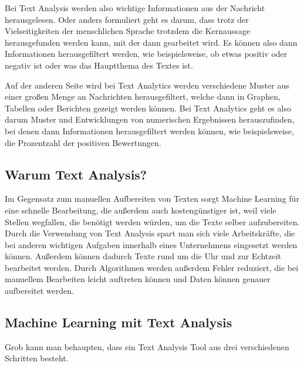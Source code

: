 Bei Text Analysis werden also wichtige Informationen aus der Nachricht herausgelesen.
Oder anders formuliert geht es darum, dass trotz der Vielseitigkeiten der menschlichen Sprache trotzdem die Kernaussage herausgefunden werden kann, mit der dann gearbeitet wird.
Es können also dann Informationen herausgefiltert werden, wie beispielsweise, ob etwas positiv oder negativ ist oder was das Hauptthema des Textes ist.\cite{textAnalysisMonkeylearn, machineLearningTextAnalysis}

Auf der anderen Seite wird bei Text Analytics werden verschiedene Muster aus einer großen Menge an Nachrichten herausgefiltert, welche dann in Graphen, Tabellen oder Berichten gezeigt werden können.
Bei Text Analytics geht es also darum Muster und Entwicklungen von numerischen Ergebnissen herauszufinden, bei denen dann Informationen herausgefiltert werden können, wie beispielsweise, die Prozentzahl der positiven Bewertungen.\cite{textAnalysisMonkeylearn, machineLearningTextAnalysis}

\subsection{Warum Text Analysis?}

Im Gegensatz zum manuellen Aufbereiten von Texten sorgt Machine Learning für eine schnelle Bearbeitung, die außerdem auch kostengünstiger ist, weil viele Stellen wegfallen, die benötigt werden würden, um die Texte selber aufzubereiten.
Durch die Verwendung von Text Analysis spart man sich viele Arbeitskräfte, die bei anderen wichtigen Aufgaben innerhalb eines Unternehmens eingesetzt werden können.
Außerdem können dadurch Texte rund um die Uhr und zur Echtzeit bearbeitet werden.
Durch Algorithmen werden außerdem Fehler reduziert, die bei manuellem Bearbeiten leicht auftreten können und Daten können genauer aufbereitet werden.\cite{textAnalysisMonkeylearn}

\subsection{Machine Learning mit Text Analysis}

Grob kann man behaupten, dass ein Text Analysis Tool aus drei verschiedenen Schritten besteht.

